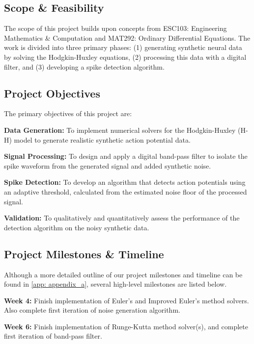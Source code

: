 \documentclass{article} %
\begin{document}
\begin{multicols}{2}
\section{Scope \& Feasibility}
\label{sec: scope_feasibility}

The scope of this project builds upon concepts from ESC103: Engineering Mathematics \& Computation and MAT292: Ordinary Differential Equations. 
The work is divided into three primary phases: (1) generating synthetic neural data by solving the Hodgkin-Huxley equations, (2) processing this data with a digital filter, and (3) developing a spike detection algorithm.

\subsection{Project Objectives}
\label{subsec: project_objectives}

The primary objectives of this project are:

\textbf{Data Generation:} To implement numerical solvers for the Hodgkin-Huxley (H-H) model to generate realistic synthetic action potential data.
    
\textbf{Signal Processing:} To design and apply a digital band-pass filter to isolate the spike waveform from the generated signal and added synthetic noise.

\textbf{Spike Detection:} To develop an algorithm that detects action potentials using an adaptive threshold, calculated from the estimated noise floor of the processed signal.

\textbf{Validation:} To qualitatively and quantitatively assess the performance of the detection algorithm on the noisy synthetic data.

\subsection{Project Milestones \& Timeline}
\label{subsec:milestones_timeline}

Although a more detailed outline of our project milestones and timeline can be found in \ref{app: appendix_a}, several high-level milestones are listed below.

\textbf{Week 4: } Finish implementation of Euler's and Improved Euler's method solvers. Also complete first iteration of noise generation algorithm.

\textbf{Week 6: } Finish implementation of Runge-Kutta method solver(s), and complete first iteration of band-pass filter.


\end{multicols}
\end{document}
